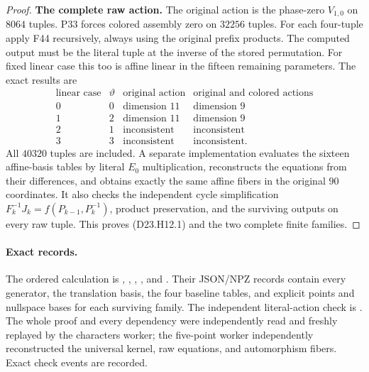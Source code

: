 \begin{proof}
\textbf{The complete raw action.}\quad
The original action is the phase-zero $V_{1,0}$ on $8064$
tuples. P33 forces colored assembly zero on $32256$ tuples.
For each four-tuple apply F44 recursively, always using
the original prefix products. The computed output must be
the literal tuple at the inverse of the stored permutation.
For fixed linear case this too is affine linear in the
fifteen remaining parameters. The exact results are
\[
\begin{array}{c|c|c|c}
\text{linear case}&\vartheta&\text{original action}&
          \text{original and colored actions}\\\hline
0&0&\text{dimension }11&\text{dimension }9\\
1&2&\text{dimension }11&\text{dimension }9\\
2&1&\text{inconsistent}&\text{inconsistent}\\
3&3&\text{inconsistent}&\text{inconsistent}.
\end{array}
                                                        \tag{D23.H12.7}
\]
All $40320$ tuples are included. A separate implementation
evaluates the sixteen affine-basis tables by literal $E_0$
multiplication, reconstructs the equations from their
differences, and obtains exactly the same affine fibers
in the original $90$ coordinates. It also checks the
independent cycle simplification
$F_k^{-1}J_k=f(P_{k-1},P_k^{-1})$, product preservation,
and the surviving outputs on every raw tuple.
This proves (D23.H12.1) and the two complete finite families.
\end{proof}

\paragraph{Exact records.}
The ordered calculation is
,
,
,
, and
.
Their JSON/NPZ records contain every generator, the
translation basis, the four baseline tables, and explicit
points and nullspace bases for each surviving family.
The independent literal-action check is
.
The whole proof and every dependency were independently read and freshly replayed by the characters worker; the five-point worker independently reconstructed the universal kernel, raw equations, and automorphism fibers. Exact check events are recorded.


